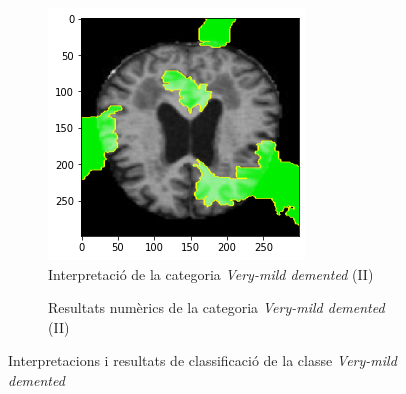 \documentclass[a4paper,12pt]{article}
\begin{document}
\begin{figure}[h!]
    \begin{subfigure}[b]{0.40\linewidth}
        \includegraphics[width=\linewidth]{images/Very mild 2.png}
        \caption{Interpretació de la categoria \textit{Very-mild demented} (II)}
        \label{fig:VMD2}
    \end{subfigure}
    \begin{subfigure}[b]{0.40\linewidth}
        \caption{Resultats numèrics de la categoria \textit{Very-mild demented} (II)}
        \label{fig:ClassificacioVMD1}
    \end{subfigure}
    \caption{Interpretacions i resultats de classificació de la classe \textit{Very-mild demented}}
    \label{fig:VMDInterpretacions}
\end{figure}
\end{document}
